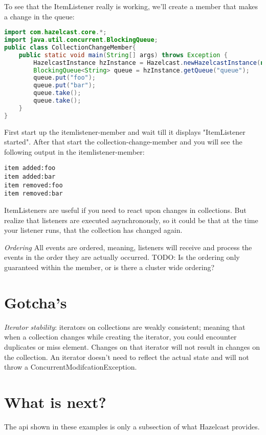 To see that the ItemListener really is working, we'll create a member that makes a change in the queue:
\begin{lstlisting}[language=java]
import com.hazelcast.core.*;
import java.util.concurrent.BlockingQueue;
public class CollectionChangeMember{
    public static void main(String[] args) throws Exception {
        HazelcastInstance hzInstance = Hazelcast.newHazelcastInstance(null);
        BlockingQueue<String> queue = hzInstance.getQueue("queue");
        queue.put("foo");
        queue.put("bar");
        queue.take();
        queue.take();
    }
}
\end{lstlisting}
First start up the itemlistener-member and wait till it displays "ItemListener started". After that start the collection-change-member and you will see the following output in the itemlistener-member:
\begin{lstlisting}
item added:foo
item added:bar
item removed:foo
item removed:bar
\end{lstlisting}
ItemListeners are useful if you need to react upon changes in collections. But realize that listeners are executed asynchronously, so it could be that at the time your listener runs, that the collection has changed again. 

\emph{Ordering} All events are ordered, meaning, listeners will receive and process the events in the order they are actually occurred. TODO: Is the ordering only guaranteed within the member, or is there a cluster wide ordering?

\section{Gotcha's}
\emph{Iterator stability}: iterators on collections are weakly consistent; meaning that when a collection changes while creating the iterator, you could encounter duplicates or miss element. Changes on that iterator will not result in changes on the collection. An iterator doesn't need to reflect the actual state and will not throw a ConcurrentModifcationException.

\section{What is next?}
The api shown in these examples is only a subsection of what Hazelcast provides.